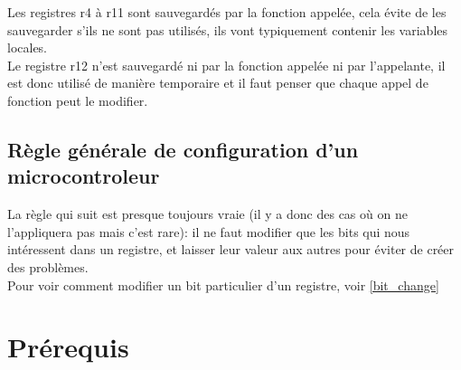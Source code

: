 \documentclass[a4paper,10pt]{article} %
\begin{document}
Les registres r4 à r11 sont sauvegardés par la fonction appelée, cela évite de les sauvegarder s'ils ne sont pas utilisés, ils vont typiquement contenir les variables locales.\\

Le registre r12 n'est sauvegardé ni par la fonction appelée ni par l'appelante, il est donc utilisé de manière temporaire et il faut penser que chaque appel de fonction peut le modifier.

\subsection{\label{rules_config}Règle générale de configuration d'un microcontroleur}
La règle qui suit est presque toujours vraie (il y a donc des cas où on ne l'appliquera pas mais c'est rare): il ne faut modifier que les bits qui nous intéressent dans un registre, et laisser leur valeur aux autres pour éviter de créer des problèmes.\\

Pour voir comment modifier un bit particulier d'un registre, voir \autoref{bit_change} 

\section{\label{prerequis}Prérequis}
\end{document}

